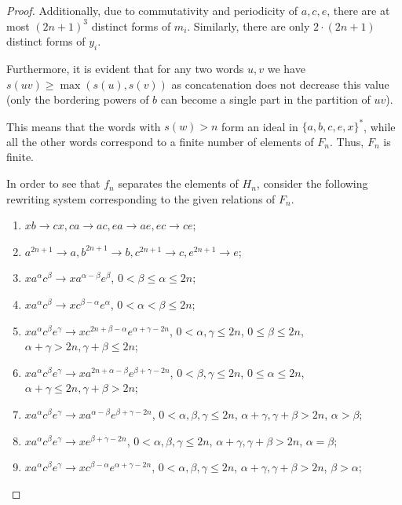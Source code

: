 \documentclass{article}
\theoremstyle{definition}
\begin{document}
\begin{proof}
Additionally, due to commutativity and periodicity of $a,c,e$, there are at most $(2n+1)^3$ distinct forms of $m_i$. Similarly, there are only $2 \cdot (2n+1)$ distinct forms of $y_i$.

Furthermore, it is evident that for any two words $u,v$ we have $s(uv) \ge \max (s(u) , s(v))$ as concatenation does not decrease this value (only the bordering powers of $b$ can become a single part in the partition of $uv$).

This means that the words with $s(w) > n$ form an ideal in $\{a,b,c,e,x\}^*$, while all the other words correspond to a finite number of elements of $F_n$. Thus, $F_n$ is finite.

In order to see that $f_n$ separates the elements of $H_n$, consider the following rewriting system corresponding to the given relations of $F_n$.

\begin{enumerate}
\item $xb \rightarrow cx, ca \rightarrow ac, ea \rightarrow ae, ec \rightarrow ce$;


\item $a^{2n+1} \rightarrow a, b^{2n+1} \rightarrow b, c^{2n+1} \rightarrow c, e^{2n+1} \rightarrow e$;

\item $x a^\alpha c^\beta \rightarrow x a^{\alpha - \beta} e^\beta$, $0< \beta \le \alpha  \le 2n$;
\item $x a^\alpha c^\beta \rightarrow x c^{\beta - \alpha} e^\alpha$, $0< \alpha < \beta  \le 2n$;
\item $x a^\alpha c^\beta e^\gamma \rightarrow x c^{2n+\beta -\alpha} e^{\alpha+\gamma -2n}$,  $0< \alpha, \gamma \le 2n$, $0 \le \beta \le 2n$, $\alpha+\gamma > 2n, \gamma+\beta \le 2n$;
\item $x a^\alpha c^\beta e^\gamma \rightarrow x a^{2n+\alpha - \beta} e^{\beta+\gamma -2n}$,  $0< \beta, \gamma \le 2n$,  $0 \le \alpha \le 2n$, $\alpha+\gamma \le 2n, \gamma+\beta > 2n$;
\item $x a^\alpha c^\beta e^\gamma \rightarrow x a^{\alpha - \beta} e^{\beta+\gamma - 2n}$,  $0< \alpha,\beta, \gamma \le 2n$, $\alpha+\gamma, \gamma+\beta > 2n$, $\alpha > \beta$;
\item $x a^\alpha c^\beta e^\gamma \rightarrow x e^{\beta+\gamma - 2n}$,  $0< \alpha,\beta, \gamma \le 2n$, $\alpha+\gamma, \gamma+\beta > 2n$,  $\alpha = \beta$;
\item $x a^\alpha c^\beta e^\gamma \rightarrow x c^{\beta - \alpha} e^{\alpha+\gamma -2n}$,  $0< \alpha,\beta, \gamma \le 2n$, $\alpha+\gamma, \gamma+\beta > 2n$, $\beta > \alpha$;


\end{enumerate}
\end{proof}
\end{document}
